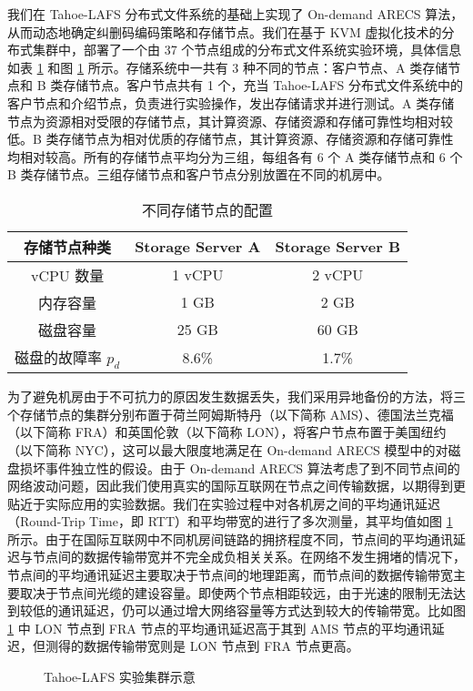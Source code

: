 我们在 Tahoe-LAFS 分布式文件系统的基础上实现了 On-demand ARECS 算法，从而动态地确定纠删码编码策略和存储节点。我们在基于 KVM 虚拟化技术的分布式集群中，部署了一个由 37 个节点组成的分布式文件系统实验环境，具体信息如表 \ref{t2} 和图 \ref{p6} 所示。存储系统中一共有 3 种不同的节点：客户节点、A 类存储节点和 B 类存储节点。客户节点共有 1 个，充当 Tahoe-LAFS 分布式文件系统中的客户节点和介绍节点，负责进行实验操作，发出存储请求并进行测试。A 类存储节点为资源相对受限的存储节点，其计算资源、存储资源和存储可靠性均相对较低。B 类存储节点为相对优质的存储节点，其计算资源、存储资源和存储可靠性均相对较高。所有的存储节点平均分为三组，每组各有 6 个 A 类存储节点和 6 个 B 类存储节点。三组存储节点和客户节点分别放置在不同的机房中。

\begin{table}[!htb]
\centering
\caption{不同存储节点的配置}
\begin{tabular}{c|c|c}
\hline
存储节点种类 & Storage Server A & Storage Server B\\\hline
vCPU 数量 & 1 vCPU & 2 vCPU\\\hline
内存容量 & 1 GB & 2 GB\\\hline
磁盘容量 & 25 GB & 60 GB\\\hline
磁盘的故障率 $p_{d}$ & 8.6\% & 1.7\%\\\hline
\end{tabular}
\label{t2}
\end{table}

为了避免机房由于不可抗力的原因发生数据丢失，我们采用异地备份的方法，将三个存储节点的集群分别布置于荷兰阿姆斯特丹（以下简称 AMS）、德国法兰克福（以下简称 FRA）和英国伦敦（以下简称 LON），将客户节点布置于美国纽约（以下简称 NYC），这可以最大限度地满足在 On-demand ARECS 模型中的对磁盘损坏事件独立性的假设。由于 On-demand ARECS 算法考虑了到不同节点间的网络波动问题，因此我们使用真实的国际互联网在节点之间传输数据，以期得到更贴近于实际应用的实验数据。我们在实验过程中对各机房之间的平均通讯延迟（Round-Trip Time，即 RTT）和平均带宽的进行了多次测量，其平均值如图 \ref{p6} 所示。由于在国际互联网中不同机房间链路的拥挤程度不同，节点间的平均通讯延迟与节点间的数据传输带宽并不完全成负相关关系。在网络不发生拥堵的情况下，节点间的平均通讯延迟主要取决于节点间的地理距离，而节点间的数据传输带宽主要取决于节点间光缆的建设容量。即使两个节点相距较远，由于光速的限制无法达到较低的通讯延迟，仍可以通过增大网络容量等方式达到较大的传输带宽。比如图 \ref{p6} 中 LON 节点到 FRA 节点的平均通讯延迟高于其到 AMS 节点的平均通讯延迟，但测得的数据传输带宽则是 LON 节点到 FRA 节点更高。

\begin{figure}[!htb]
\centering
\resizebox{.8\textwidth}{!}{}
\caption{Tahoe-LAFS 实验集群示意}
\label{p6}
\end{figure}
